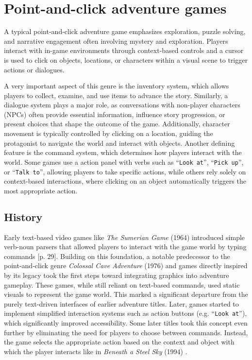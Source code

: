 \section{Point-and-click adventure games}
A typical point-and-click adventure game emphasizes exploration, puzzle solving, and narrative engagement often involving mystery and exploration. Players interact with in-game environments through context-based controls and a cursor is used to click on objects, locations, or characters within a visual scene to trigger actions or dialogues. 

A very important aspect of this genre is the inventory system, which allows players to collect, examine, and use items to advance the story. Similarly, a dialogue system plays a major role, as conversations with non-player characters (NPCs) often provide essential information, influence story progression, or present choices that shape the outcome of the game. Additionally, character movement is typically controlled by clicking on a location, guiding the protagonist to navigate the world and interact with objects. Another defining feature is the command system, which determines how players interact with the world. Some games use a action panel with verbs such as “\texttt{Look at}”, “\texttt{Pick up}”, or “\texttt{Talk to}”, allowing players to take specific actions, while others rely solely on context-based interactions, where clicking on an object automatically triggers the most appropriate action. 

\subsection{History}
Early text-based video games like \textit{The Sumerian Game} (1964) introduced simple verb-noun parsers that allowed players to interact with the game world by typing commands \cite{Salter2014}[p. 29]. Building on this foundation, a notable predecessor to the point-and-click genre \textit{Colossal Cave Adventure} (1976) and games directly inspired by its legacy took the first steps toward integrating graphics into adventure gameplay. These games, while still reliant on text-based commands, used static visuals to represent the game world. This marked a significant departure from the purely text-driven interfaces of earlier adventure titles. Later, games started to implement simplified interaction systems such as action buttons (e.g. “\texttt{Look at}”), which significantly improved accessibility. Some later titles took this concept even further by eliminating the need for players to choose between commands. Instead, the game selects the appropriate action based on the context and object with which the player interacts like in \textit{Beneath a Steel Sky} (1994) \cite{Carton2023history}.

